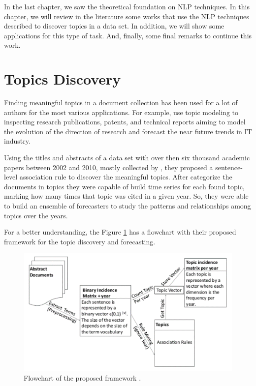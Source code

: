 In the last chapter, we saw the theoretical foundation on NLP techniques. In this chapter, we will review in the literature some works that use the NLP techniques described to discover topics in a data set. In addition, we will show some applications for this type of task. And, finally, some final remarks to continue this work.

\section{Topics Discovery}

Finding meaningful topics in a document collection has been used for a lot of authors for the most various applications. For example, \cite{hurtado2016topic} use topic modeling to inspecting research publications, patents, and technical reports aiming to model the evolution of the direction of research and forecast the near future trends in IT industry.

Using the titles and abstracts of a data set with over then six thousand academic papers between 2002 and 2010, mostly collected by , they proposed a sentence-level association rule to discover the meaningful topics. After categorize the documents in topics they were capable of build time series for each found topic, marking how many times that topic was cited in a given year. So, they were able to build an ensemble of forecasters to study the patterns and relationships among topics over the years.

For a better understanding, the Figure \ref{fig:topic-discovery-framework} has a flowchart with their proposed framework for the topic discovery and forecasting.

\begin{figure}[h!]
	\centering
	\includegraphics[width=0.6\linewidth]{01.Chapters/03.RelatedWorks/topic-discovery-framework}
	\caption{Flowchart of the proposed framework \cite{hurtado2016topic}.}
	\label{fig:topic-discovery-framework}
\end{figure}

